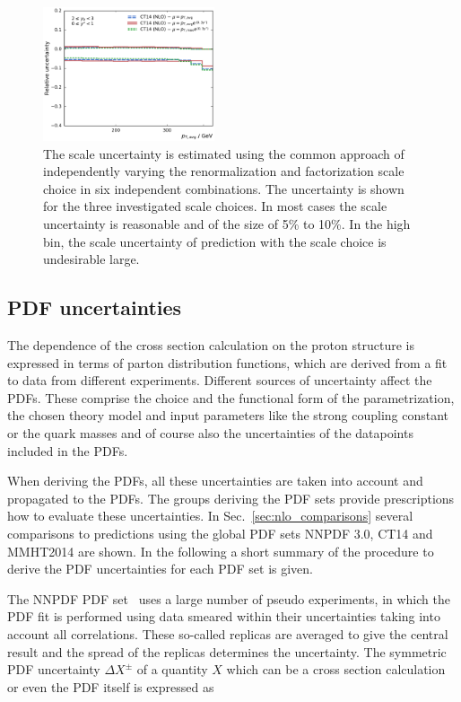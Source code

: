 \begin{figure}[htp]
    \includegraphics[width=0.45\textwidth]{figures/theory/scale_uncert_comp_yb2ys0.pdf}
    \caption{The scale uncertainty is estimated using the common approach of
        independently varying the renormalization and factorization scale
        choice in six independent combinations. The uncertainty is shown for the
        three investigated scale choices. In most cases the scale uncertainty is
        reasonable and of the size of 5\% to 10\%. In the high \ystar bin, the
        scale uncertainty of prediction with the \ptavg scale choice is
        undesirable large.}
    \label{fig:scale_uncertainties}
\end{figure}

\subsection{PDF uncertainties}

The dependence of the cross section calculation on the proton structure is
expressed in terms of parton distribution functions, which are derived from a
fit to data from different experiments. Different sources of
uncertainty affect the PDFs. These comprise the choice and the
functional form of the parametrization, the chosen theory model and input
parameters like the strong coupling constant \as or the quark masses and of
course also the uncertainties of the datapoints included in the PDFs.

When deriving the PDFs, all these uncertainties are taken into account and
propagated to the PDFs. The groups deriving the PDF sets provide prescriptions
how to evaluate these uncertainties. In Sec.~\ref{sec:nlo_comparisons} several
comparisons to predictions using the global PDF sets NNPDF 3.0, CT14 and
MMHT2014 are shown. In the following a short summary of the procedure to derive
the PDF uncertainties for each PDF set is given.

The NNPDF PDF set~\cite{Ball:2014uwa} uses a large number of pseudo experiments, in which the PDF
fit is performed using data smeared within their uncertainties taking into
account all correlations. These so-called replicas are averaged to give the
central result and the spread of the replicas determines the uncertainty. The
symmetric PDF uncertainty $\Delta X^\pm$ of a quantity $X$ which can be a cross section calculation or
even the PDF itself is expressed as


